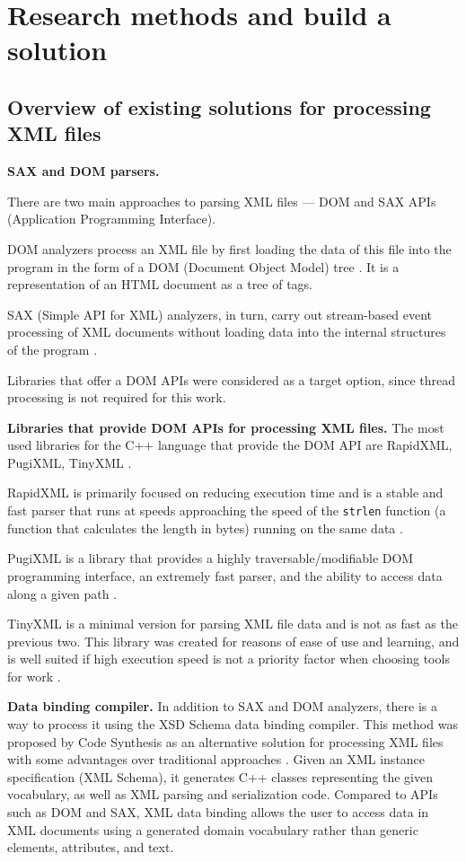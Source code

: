 \section{Research methods and build a solution}

\subsection{Overview of existing solutions for processing XML files}

\textbf{SAX and DOM parsers.}

There are two main approaches to parsing XML files --- DOM and SAX APIs (Application Programming Interface).

DOM analyzers process an XML file by first loading the data of this file into the program in the form of a DOM (Document Object Model) tree \cite{m6}. It is a representation of an HTML document as a tree of tags.

SAX (Simple API for XML) analyzers, in turn, carry out stream-based event processing of XML documents without loading data into the internal structures of the program \cite{m7}.

Libraries that offer a DOM APIs were considered as a target option, since thread processing is not required for this work.

\textbf{Libraries that provide DOM APIs for processing XML files.} The most used libraries for the C++ language that provide the DOM API are RapidXML, PugiXML, TinyXML \cite{m9}.

RapidXML is primarily focused on reducing execution time and is a stable and fast parser that runs at speeds approaching the speed of the \texttt{strlen} function (a function that calculates the length in bytes) running on the same data \cite{m10}.

PugiXML is a library that provides a highly traversable/modifiable DOM programming interface, an extremely fast parser, and the ability to access data along a given path \cite{m11}.

TinyXML is a minimal version for parsing XML file data and is not as fast as the previous two. This library was created for reasons of ease of use and learning, and is well suited if high execution speed is not a priority factor when choosing tools for work \cite{m12}.

\textbf{Data binding compiler.} In addition to SAX and DOM analyzers, there is a way to process it using the XSD Schema data binding compiler. This method was proposed by Code Synthesis as an alternative solution for processing XML files with some advantages over traditional approaches \cite{m14}. Given an XML instance specification (XML Schema), it generates C++ classes representing the given vocabulary, as well as XML parsing and serialization code. Compared to APIs such as DOM and SAX, XML data binding allows the user to access data in XML documents using a generated domain vocabulary rather than generic elements, attributes, and text.


